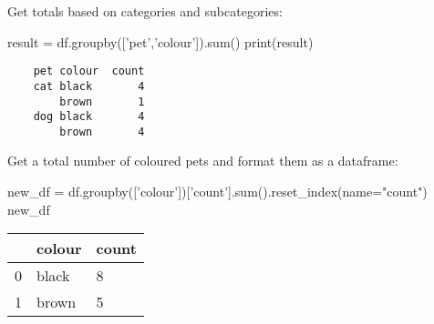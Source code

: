 Get totals based on categories and subcategories:

\begin{pycode}
    result = df.groupby(['pet','colour']).sum()
    print(result)
\end{pycode}

\begin{verbatim}
    pet colour  count
    cat black       4
        brown       1
    dog black       4
        brown       4
\end{verbatim}

Get a total number of coloured pets and format them as a dataframe:

\begin{pycode}
    new_df = df.groupby(['colour'])['count'].sum().reset_index(name="count")
    new_df
\end{pycode}

\begin{tabular}{l l l}
    &colour	&count \\
    \hline
    0	&black	&8 \\
    1	&brown	&5\\
\end{tabular}